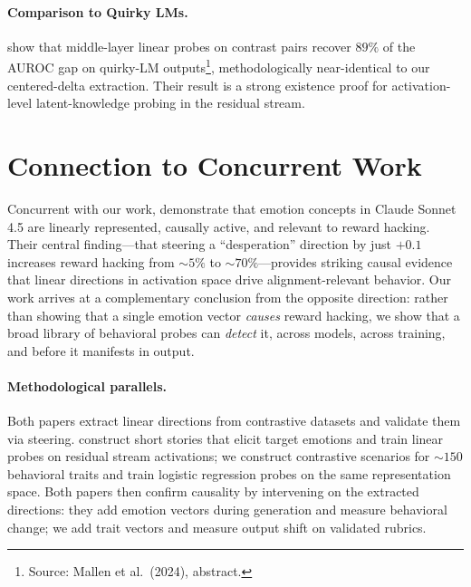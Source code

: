 \documentclass[11pt]{article}
\begin{document}
\paragraph{Comparison to Quirky LMs.}
\citet{mallen2024quirky} show that middle-layer linear probes on contrast pairs recover $89\%$ of the AUROC gap on quirky-LM outputs\footnote{Source: Mallen et al.~(2024), abstract.}, methodologically near-identical to our centered-delta extraction. Their result is a strong existence proof for activation-level latent-knowledge probing in the residual stream.


\section{Connection to Concurrent Work}
\label{sec:concurrent}

Concurrent with our work, \cite{sofroniew2026emotion} demonstrate that emotion concepts in Claude Sonnet 4.5 are linearly represented, causally active, and relevant to reward hacking.
Their central finding---that steering a ``desperation'' direction by just $+0.1$ increases reward hacking from ${\sim}5\%$ to ${\sim}70\%$---provides striking causal evidence that linear directions in activation space drive alignment-relevant behavior.
Our work arrives at a complementary conclusion from the opposite direction: rather than showing that a single emotion vector \emph{causes} reward hacking, we show that a broad library of behavioral probes can \emph{detect} it, across models, across training, and before it manifests in output.

\paragraph{Methodological parallels.}
Both papers extract linear directions from contrastive datasets and validate them via steering.
\cite{sofroniew2026emotion} construct short stories that elicit target emotions and train linear probes on residual stream activations; we construct contrastive scenarios for ${\sim}150$ behavioral traits and train logistic regression probes on the same representation space.
Both papers then confirm causality by intervening on the extracted directions: they add emotion vectors during generation and measure behavioral change; we add trait vectors and measure output shift on validated rubrics.
\end{document}
